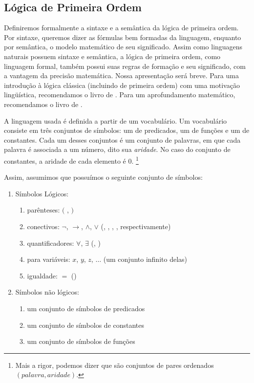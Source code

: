 \subsection{Lógica de Primeira Ordem}

Definiremos formalmente a sintaxe e a semântica da lógica de primeira ordem. Por sintaxe, queremos dizer as fórmulas bem formadas da linguagem, enquanto por semântica, o modelo matemático de seu significado. Assim como linguagens naturais possuem sintaxe e semântica, a lógica de primeira ordem, como linguagem formal, também possui suas regras de formação e seu significado, com a vantagem da precisão matemática. Nossa apresentação será breve. Para uma introdução à lógica clássica (incluindo de primeira ordem) com uma motivação lingüística, recomendamos o livro de \citet{gamut1}.  Para um aprofundamento matemático, recomendamos o livro de \citet{enderton}.

A linguagem usada é definida a partir de um vocabulário. Um vocabulário consiste em três conjuntos de símbolos: um de predicados, um de funções e um de constantes. Cada um desses conjuntos é um conjunto de palavras, em que cada palavra é associada a um número, dito sua \textit{aridade}. No caso do conjunto de constantes, a aridade de cada elemento é $0$. \footnote{Mais a rigor, podemos dizer que são conjuntos de pares ordenados $(palavra,aridade)$.}

Assim, assumimos que possuímos o seguinte conjunto de símbolos:
\begin{enumerate}
\item 	Símbolos Lógicos:
		\begin{enumerate}
		\item parênteses: $($ , $)$
		\item conectivos: $\neg$, $\rightarrow$, $\land$, $\lor$ (, , , , respectivamente)
		\item quantificadores: $\forall$, $\exists$ (, )
		\item para variáveis: $x$, $y$, $z$, $\dots$ (um conjunto infinito delas)
		\item igualdade: $=$ ()
		\end{enumerate}
\item	Símbolos não lógicos:
		\begin{enumerate}
		\item um conjunto de símbolos de predicados
		\item um conjunto de símbolos de constantes
		\item um conjunto de símbolos de funções
		\end{enumerate}
\end{enumerate}

